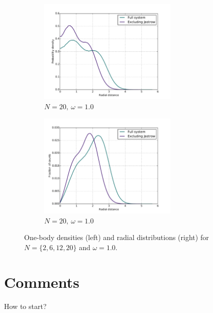 \documentclass[english, a4paper]{article}
\begin{document}
\begin{figure}[H]
	\begin{subfigure}{0.5\textwidth}
		\includegraphics[width=\textwidth, height= 5cm]{figures/radialDistribution/OneBodyDensityN20w100Se8.pdf}
		\caption{$N=20,\:\omega=1.0$}
	\end{subfigure}
	\begin{subfigure}{0.5\textwidth}
		\includegraphics[width=\textwidth, height= 5cm]{figures/radialDistribution/radialDistributionN20w100Se8.pdf}
		\caption{$N=20,\:\omega=1.0$}
	\end{subfigure}
	
	\vspace{3mm}
	
	\caption{One-body densities (left) and radial distributions (right) for $N=\{2,6,12,20\}$ and $\omega = 1.0$.}
	\label{fig:Onebody&RadialDist}
\end{figure}









	
	\section{Comments}
	How to start?
	
\end{document}
